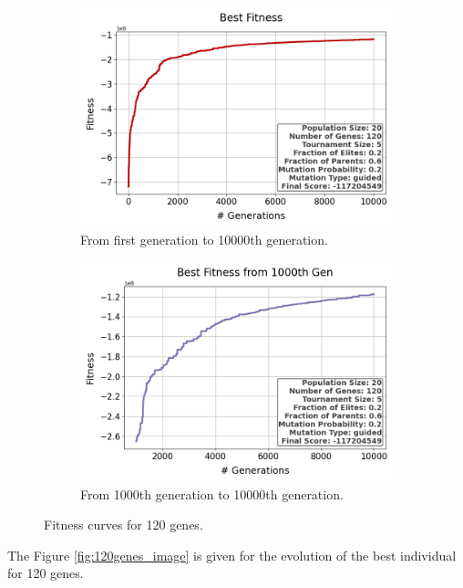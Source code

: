 \documentclass{assignment}
\begin{document}
\begin{figure}[h!]
    \begin{subfigure}{0.5\textwidth}
        \includegraphics[width=\textwidth]{figures/best_fitness_output_20_120_5_0.2_0.6_0.2_guided.png}
        \caption{From first generation to 10000th generation.}
    \end{subfigure}\hfill
    \begin{subfigure}{0.5\textwidth}
        \includegraphics[width=\textwidth]{figures/best_fitness_1000_output_20_120_5_0.2_0.6_0.2_guided.png}
        \caption{From 1000th generation to 10000th generation.}
    \end{subfigure}
    \caption{Fitness curves for 120 genes.}
\label{fig:120genes}
\end{figure}

The Figure \ref{fig:120genes_image} is given for the evolution of the best individual for 120 genes.
\end{document}
